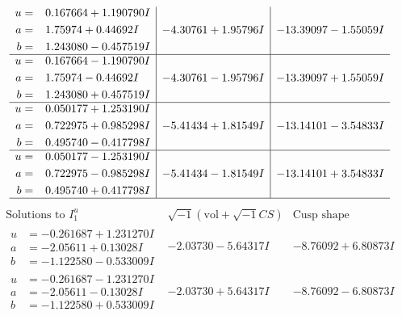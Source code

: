 \documentclass[1p]{elsarticle_modified}
\theoremstyle{definition}
\newcommand{\I}{\sqrt{-1}}
\begin{document}
$$\begin{array}{c|c|c}
\begin{aligned}
u &= \phantom{-}0.167664 + 1.190790 I \\
a &= \phantom{-}1.75974 + 0.44692 I \\
b &= \phantom{-}1.243080 - 0.457519 I\end{aligned}
 & -4.30761 + 1.95796 I & -13.39097 - 1.55059 I \\ \hline\begin{aligned}
u &= \phantom{-}0.167664 - 1.190790 I \\
a &= \phantom{-}1.75974 - 0.44692 I \\
b &= \phantom{-}1.243080 + 0.457519 I\end{aligned}
 & -4.30761 - 1.95796 I & -13.39097 + 1.55059 I \\ \hline\begin{aligned}
u &= \phantom{-}0.050177 + 1.253190 I \\
a &= \phantom{-}0.722975 + 0.985298 I \\
b &= \phantom{-}0.495740 - 0.417798 I\end{aligned}
 & -5.41434 + 1.81549 I & -13.14101 - 3.54833 I \\ \hline\begin{aligned}
u &= \phantom{-}0.050177 - 1.253190 I \\
a &= \phantom{-}0.722975 - 0.985298 I \\
b &= \phantom{-}0.495740 + 0.417798 I\end{aligned}
 & -5.41434 - 1.81549 I & -13.14101 + 3.54833 I\\
 \hline 
 \end{array}$$\newpage$$\begin{array}{c|c|c}  
\text{Solutions to }I^u_{1}& \I (\text{vol} + \sqrt{-1}CS) & \text{Cusp shape}\\
 \hline 
\begin{aligned}
u &= -0.261687 + 1.231270 I \\
a &= -2.05611 + 0.13028 I \\
b &= -1.122580 - 0.533009 I\end{aligned}
 & -2.03730 - 5.64317 I & -8.76092 + 6.80873 I \\ \hline\begin{aligned}
u &= -0.261687 - 1.231270 I \\
a &= -2.05611 - 0.13028 I \\
b &= -1.122580 + 0.533009 I\end{aligned}
 & -2.03730 + 5.64317 I & -8.76092 - 6.80873 I \\ \hline\begin{aligned}

\end{aligned}
\end{array}$$
\end{document}
